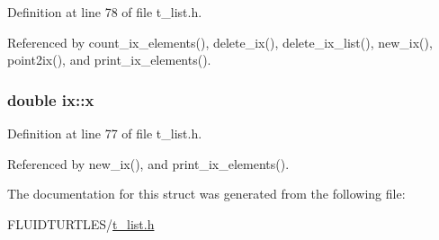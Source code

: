 Definition at line 78 of file t\-\_\-list.\-h.



Referenced by count\-\_\-ix\-\_\-elements(), delete\-\_\-ix(), delete\-\_\-ix\-\_\-list(), new\-\_\-ix(), point2ix(), and print\-\_\-ix\-\_\-elements().

\hypertarget{structix_a0fd2a5f2842ddbc1eab6160be5cfb726}{
\subsubsection[{x}]{\setlength{\rightskip}{0pt plus 5cm}double ix\-::x}}\label{structix_a0fd2a5f2842ddbc1eab6160be5cfb726}


Definition at line 77 of file t\-\_\-list.\-h.



Referenced by new\-\_\-ix(), and print\-\_\-ix\-\_\-elements().



The documentation for this struct was generated from the following file\-:\begin{DoxyCompactItemize}
\item 
F\-L\-U\-I\-D\-T\-U\-R\-T\-L\-E\-S/\hyperlink{t__list_8h}{t\-\_\-list.\-h}\end{DoxyCompactItemize}
